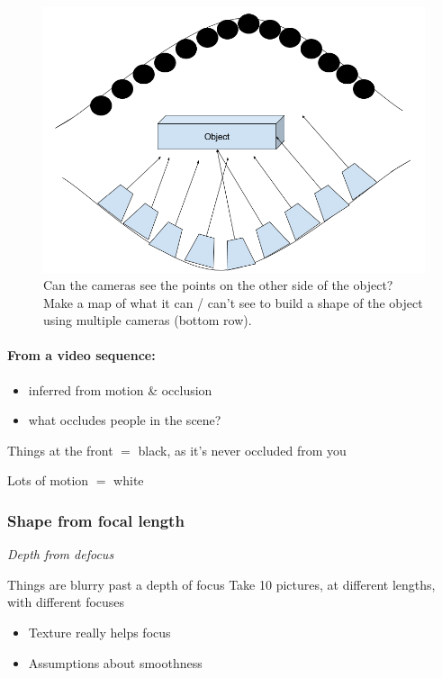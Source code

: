 \documentclass[paper=a4, fontsize=11pt]{article} %
\numberwithin{equation}{section} %
\numberwithin{figure}{section} %
\numberwithin{table}{section} %
\begin{document}
\begin{figure}[h]
    \centering
\includegraphics[scale=0.3]{images/occlusion}
\caption{Can the cameras see the points on the other side of the object? Make a map of what it can / can't see to build a shape of the object using multiple cameras (bottom row).}
    \label{fig:occlusion}
\end{figure}

\paragraph{From a video sequence:}
\begin{itemize}
\item inferred from motion \& occlusion
\item what occludes people in the scene?
\end{itemize}

Things at the front $=$ black, as it's never occluded from you 

Lots of motion $=$ white

\subsubsection{Shape from focal length}

\textit{Depth from defocus}

Things are blurry past a depth of focus
Take 10 pictures, at different lengths, with different focuses

\begin{itemize}
\item Texture really helps focus
\item Assumptions about smoothness
\end{itemize}
\end{document}
